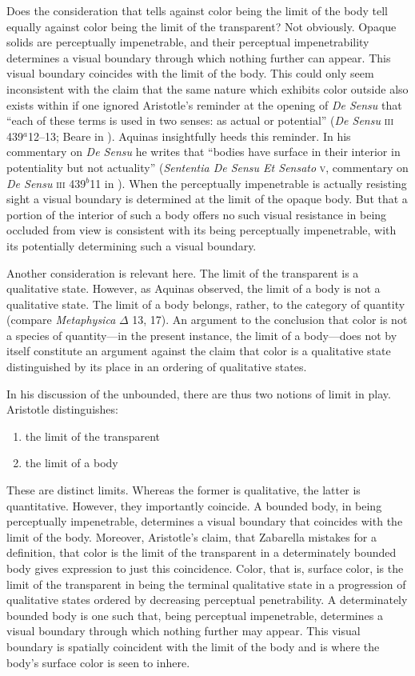 \documentclass[12pt]{article}
\begin{document}
Does the consideration that tells against color being the limit of the body tell equally against color being the limit of the transparent? Not obviously. Opaque solids are perceptually impenetrable, and their perceptual impenetrability determines a visual boundary through which nothing further can appear. This visual boundary coincides with the limit of the body. This could only seem inconsistent with the claim that the same nature which exhibits color outside also exists within if one ignored Aristotle's reminder at the opening of \emph{De Sensu} that ``each of these terms is used in two senses: as actual or potential'' (\emph{De Sensu} \textsc{iii} 439\( ^{a} \)12--13; Beare in \citealt[7]{Barnes:1984uq}). Aquinas insightfully heeds this reminder. In his commentary on \emph{De Sensu} he writes that ``bodies have surface in their interior in potentiality but not actuality'' (\emph{Sententia De Sensu Et Sensato} \textsc{v}, commentary on \emph{De Sensu} \textsc{iii} 439\( ^{b} \)11 in \citealt{White:2005vn}). When the perceptually impenetrable is actually resisting sight a visual boundary is determined at the limit of the opaque body. But that a portion of the interior of such a body offers no such visual resistance in being occluded from view is consistent with its being perceptually impenetrable, with its potentially determining such a visual boundary.

Another consideration is relevant here. The limit of the transparent is a qualitative state. However, as Aquinas observed, the limit of a body is not a qualitative state. The limit of a body belongs, rather, to the category of quantity (compare \emph{Metaphysica} \( \Delta \) 13, 17). An argument to the conclusion that color is not a species of quantity---in the present instance, the limit of a body---does not by itself constitute an argument against the claim that color is a qualitative state distinguished by its place in an ordering of qualitative states.

In his discussion of the unbounded, there are thus two notions of limit in play. Aristotle distinguishes:
\begin{enumerate}[(1)]
	\item the limit of the transparent
	\item the limit of a body
\end{enumerate}
These are distinct limits. Whereas the former is qualitative, the latter is quantitative. However, they importantly coincide. A bounded body, in being perceptually impenetrable, determines a visual boundary that coincides with the limit of the body. Moreover, Aristotle's claim, that Zabarella mistakes for a definition, that color is the limit of the transparent in a determinately bounded body gives expression to just this coincidence. Color, that is, surface color, is the limit of the transparent in being the terminal qualitative state in a progression of qualitative states ordered by decreasing perceptual penetrability. A determinately bounded body is one such that, being perceptual impenetrable, determines a visual boundary through which nothing further may appear. This visual boundary is spatially coincident with the limit of the body and is where the body's surface color is seen to inhere.
\end{document}
